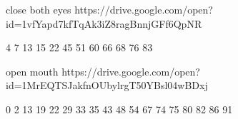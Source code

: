 
\begin{myverbbox}[\small]{\vinput}
close both eyes
https://drive.google.com/open?id=1vfYapd7kfTqAk3iZ8ragBnnjGFf6QpNR
\end{myverbbox}
\begin{myverbbox}[\small]{\voutput}
4 7 13 15 22 45 51 60 66 68 76 83
\end{myverbbox}


\begin{myverbbox}[\small]{\vinput}
open mouth
https://drive.google.com/open?id=1MrEQTSJakfnOUbylrgT50YBsl04wBDxj
\end{myverbbox}
\begin{myverbbox}[\small]{\voutput}
0 2 13 19 22 29 33 35 43 48 54 67 74 75 80 82 86 91
\end{myverbbox}

